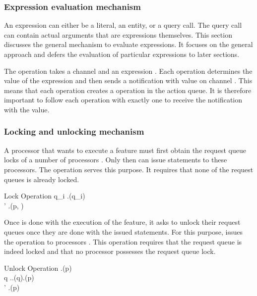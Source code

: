 \subsubsection{Expression evaluation mechanism}\label{sec:expression evaluation mechanism}
An expression can either be a literal, an entity, or a query call. The query call can contain actual arguments that are expressions themselves. This section discusses the general mechanism to evaluate expressions. It focuses on the general approach and defers the evaluation of particular expressions to later sections.

The operation  takes a channel  and an expression . Each  operation determines the value  of the expression  and then sends a notification with value  on channel . This means that each  operation creates a  operation in the action queue. It is therefore important to follow each  operation with exactly one  to receive the notification with the value.
\subsubsection{Locking and unlocking mechanism}
A processor  that wants to execute a feature must first obtain the request queue locks of a number of processors . Only then can  issue statements to these processors. The  operation serves this purpose. It requires that none of the request queues is already locked.

\singlelineinferencerule
	{Lock Operation}
	{
		\neg \exists q_{i} \in {} \colon \state.\isrequestqueuelockedfeature(q_{i}) \\
		\state' \mathematicaldefinition \state.\lockrequestqueuesfeature(p, )
	}
	{}
	{}
 
Once  is done with the execution of the feature, it asks  to unlock their request queues once they are done with the issued statements. For this purpose,  issues the  operation to processors . This operation requires that the request queue is indeed locked and that no processor possesses the request queue lock.

\singlelineinferencerule
	{Unlock Operation}
	{
		\state.\isrequestqueuelockedfeature(p) \\
		\forall q \in \state.\processorsfeature \colon \neg \state.\requestqueuelocksfeature(q).\containsfeature(p) \\
		\state' \mathematicaldefinition \state.\unlockrequestqueuefeature(p)
	}
	{}
	{}
 
